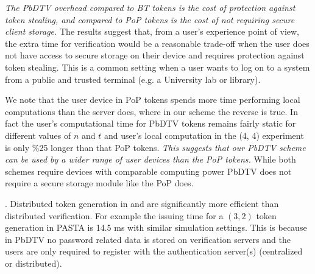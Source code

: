 \documentclass[conference]{IEEEtran}
\begin{document}
{\em The PbDTV overhead compared to BT tokens is the cost of protection against token stealing, and compared to PoP tokens is the cost of not requiring secure client storage.} The results suggest that, from a user’s experience point of view, the extra time for verification would be a reasonable trade-off when the user does not have access to secure storage on their device and requires protection against token stealing. This is a common setting when a user wants to log on to a system from a public and trusted terminal (e.g. a University lab or library).

We note that the user device in PoP tokens spends more time performing local computations than the server does, where in our scheme the reverse is true. In fact the user’s computational time for PbDTV tokens remains fairly static for different values of $n$ and $t$ and user’s local computation in the (4, 4) experiment is only \%25 longer than that PoP tokens. {\em This suggests that our PbDTV scheme can be used by a wider range of user devices than the PoP tokens.} While both schemes require devices with comparable computing power PbDTV does not require a secure storage module like the PoP does.  

. Distributed token generation in \cite{PASTA-Agrawal} %
and \cite{PESTO-baum} %
are significantly more efficient than distributed verification. For example the issuing time for a $(3,2)$ token generation in PASTA is 14.5 ms with similar simulation settings. This is because in PbDTV no password related data is stored on verification servers and the users are only required to register with the authentication server(s) (centralized or distributed).  
\end{document}
